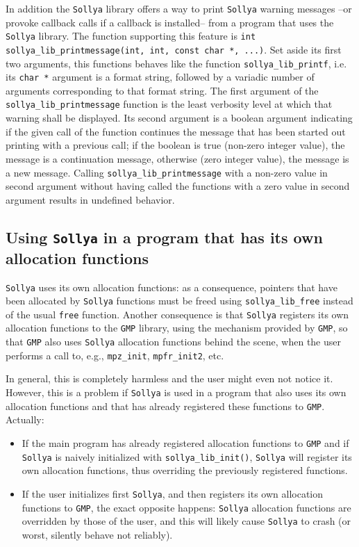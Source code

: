 \documentclass[a4paper]{article}
\newcommand{\sollya}{\texttt{Sollya}\xspace}
\begin{document}
In addition the \sollya library offers a way to print \sollya warning messages --or provoke callback calls if a callback is installed-- from a program that uses the \sollya library. The function supporting this feature
is \verb|int sollya_lib_printmessage(int, int, const char *, ...)|. Set aside its first two arguments, this functions behaves like the function \verb|sollya_lib_printf|, i.e. its \verb|char *| argument is a format
string, followed by a variadic number of arguments corresponding to that format string. The first argument of the \verb|sollya_lib_printmessage| function is the least verbosity level at which that warning shall be displayed.
Its second argument is a boolean argument indicating if the given call of the function continues the message that has been started out printing with a previous call; if the boolean is true (non-zero integer value), the message
is a continuation message, otherwise (zero integer value), the message is a new message. Calling \verb|sollya_lib_printmessage| with a non-zero value in second argument without having called the functions with a zero value
in second argument results in undefined behavior.

\subsection{Using \sollya in a program that has its own allocation functions}
\label{customMemoryFunctions}
\sollya uses its own allocation functions: as a consequence, pointers that have been allocated by \sollya functions must be freed using \verb|sollya_lib_free| instead of the usual \verb|free| function. Another consequence is that \sollya registers its own allocation functions to the \verb|GMP| library, using the mechanism provided by \verb|GMP|, so that \verb|GMP| also uses \sollya allocation functions behind the scene, when the user performs a call to, e.g., \verb|mpz_init|, \verb|mpfr_init2|, etc.

In general, this is completely harmless and the user might even not notice it. However, this is a problem if \sollya is used in a program that also uses its own allocation functions and that has already registered these functions to \verb|GMP|. Actually:
\begin{itemize}
\item If the main program has already registered allocation functions to \verb|GMP| and if \sollya is naively initialized with \verb|sollya_lib_init()|, \sollya will register its own allocation functions, thus overriding the previously registered functions.
\item If the user initializes first \sollya, and then registers its own allocation functions to \verb|GMP|, the exact opposite happens: \sollya allocation functions are overridden by those of the user, and this will likely cause \sollya to crash (or worst, silently behave not reliably).
\end{itemize}
\end{document}
